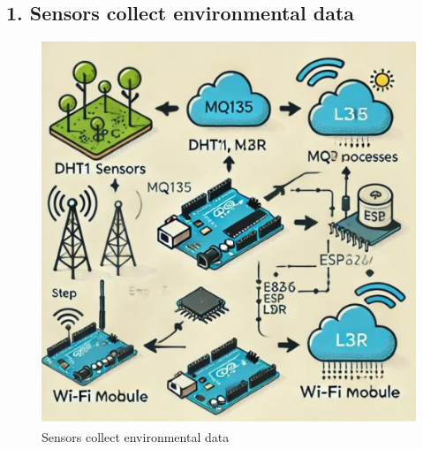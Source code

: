 \documentclass[12pt]{report}
\begin{document}
	\subsection*{1. Sensors collect environmental data}
	\begin{figure}[ht]
		\centering
		\includegraphics[scale=1]{environmentdata.jpg}
		\caption[environment_fig]{Sensors collect environmental data}
		\label{environment_fig}
	\end{figure}
	
\end{document}
